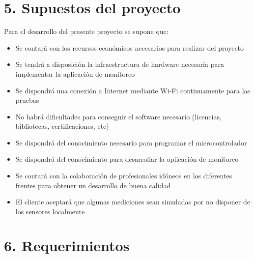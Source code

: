 \documentclass[
11pt, %
]{charter}
\begin{document}
\section{5. Supuestos del proyecto}
\label{sec:supuestos}

Para el desarrollo del presente proyecto se supone que: 
\begin{itemize}
	\item Se contará con los recursos económicos necesarios para realizar del proyecto
	\item Se tendrá a disposición la infraestructura de hardware necesaria para implementar la aplicación de monitoreo
	\item Se dispondrá una conexión a Internet mediante Wi-Fi continuamente para las pruebas
	\item No habrá dificultades para conseguir el software necesario (licencias, bibliotecas, certificaciones, etc)
	\item Se dispondrá del conocimiento necesario para programar el microcontrolador
	\item Se dispondrá del conocimiento para desarrollar la aplicación de monitoreo
	\item Se contará con la colaboración de profesionales idóneos en los diferentes frentes para obtener un desarrollo de buena calidad
	\item El cliente aceptará que algunas mediciones sean simuladas por no disponer de los sensores localmente
\end{itemize}

\section{6. Requerimientos}
\label{sec:requerimientos}
\end{document}
